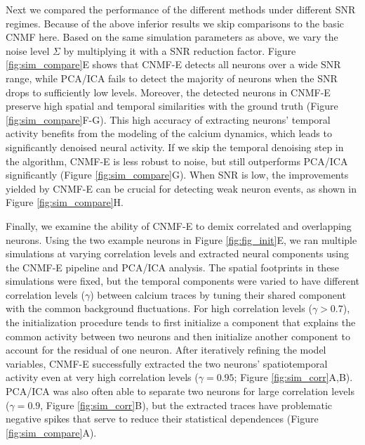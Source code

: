 \documentclass[9pt,lineno]{elife}
\begin{document}
Next we compared the performance of the different methods under different SNR regimes.  Because of the above inferior results we skip comparisons to the basic CNMF here. Based on the same simulation parameters as above, we vary the noise level $\Sigma$ by multiplying it with a SNR reduction factor. Figure \ref{fig:sim_compare}E shows that CNMF-E detects all neurons over a wide SNR range, while PCA/ICA fails to detect the majority of neurons when the SNR drops to sufficiently low levels. Moreover, the detected neurons in CNMF-E preserve high  spatial and  temporal similarities with the ground truth (Figure \ref{fig:sim_compare}F-G). This high accuracy of extracting neurons' temporal activity benefits from the modeling of the calcium dynamics, which leads to significantly denoised neural activity.  If we skip the temporal denoising step in the algorithm, CNMF-E is less robust to noise, but still outperforms PCA/ICA significantly (Figure \ref{fig:sim_compare}G). When SNR is low, the improvements yielded by CNMF-E can be crucial for detecting weak neuron events, as shown in Figure \ref{fig:sim_compare}H.

Finally, we examine the ability of CNMF-E to demix correlated and overlapping neurons. Using the two example neurons in Figure \ref{fig:fig_init}E, we ran multiple simulations at varying correlation levels and extracted neural components using the CNMF-E pipeline and PCA/ICA analysis. The spatial footprints in these simulations were fixed, but the temporal components were varied to have different correlation levels ($\gamma$) between calcium traces by tuning their shared component with the common background fluctuations. For high correlation levels ($\gamma >0.7$), the initialization procedure tends to first initialize a component that explains the common activity between two neurons and then initialize another component to account for the residual of one neuron. 
After iteratively refining the model variables, CNMF-E successfully extracted the two neurons' spatiotemporal activity even at very high correlation levels ($\gamma = 0.95$; Figure \ref{fig:sim_corr}A,B). PCA/ICA was also often able to separate two neurons for large correlation levels ($\gamma=0.9$, Figure \ref{fig:sim_corr}B), but the extracted traces have problematic negative spikes that serve to reduce their statistical dependences (Figure \ref{fig:sim_compare}A).  %
\end{document}

